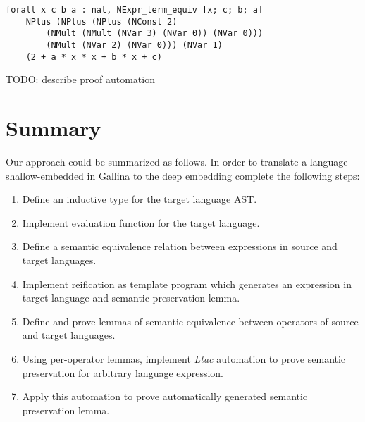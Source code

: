 \documentclass[sigplan]{acmart}\settopmatter{printfolios=true,printccs=false,printacmref=false}
\begin{document}
\begin{lstlisting}[language=Coq, mathescape=true,
  frame=single, basicstyle=\footnotesize]
forall x c b a : nat, NExpr_term_equiv [x; c; b; a]
    NPlus (NPlus (NPlus (NConst 2)
        (NMult (NMult (NVar 3) (NVar 0)) (NVar 0)))
        (NMult (NVar 2) (NVar 0))) (NVar 1)
    (2 + a * x * x + b * x + c)
\end{lstlisting}

TODO: describe proof automation

\section{Summary}

Our approach could be summarized as follows. In order to translate a
language shallow-embedded in Gallina to the deep embedding complete
the following steps:

\begin{enumerate}
\item Define an inductive type for the target language AST.
\item Implement evaluation function for the target language.
\item Define a semantic equivalence relation between expressions in
  source and target languages.
\item Implement reification as template program which generates an
  expression in target language and semantic preservation lemma.
\item Define and prove lemmas of semantic equivalence between
  operators of source and target languages.
\item Using per-operator lemmas, implement \emph{Ltac} automation to prove
  semantic preservation for arbitrary language expression.
\item Apply this automation to prove automatically generated semantic
  preservation lemma.  
\end{enumerate}



\nocite{*}

\end{document}
